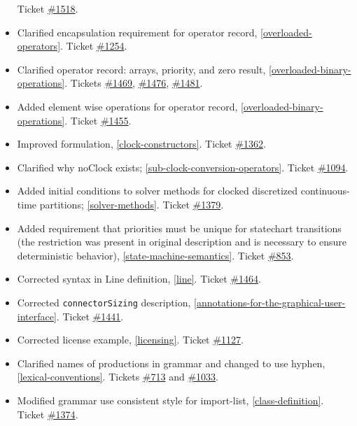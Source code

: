 \begin{itemize}
  Ticket \href{https://github.com/modelica/ModelicaSpecification/issues/1518}{\#1518}.
\item
  Clarified encapsulation requirement for operator record, \cref{overloaded-operators}.
  Ticket \href{https://github.com/modelica/ModelicaSpecification/issues/1254}{\#1254}.
\item
  Clarified operator record: arrays, priority, and zero result,
  \cref{overloaded-binary-operations}. Tickets
  \href{https://github.com/modelica/ModelicaSpecification/issues/1469}{\#1469},
  \href{https://github.com/modelica/ModelicaSpecification/issues/1476}{\#1476},
  \href{https://github.com/modelica/ModelicaSpecification/issues/1481}{\#1481}.
\item
  Added element wise operations for operator record, \cref{overloaded-binary-operations}.
  Ticket \href{https://github.com/modelica/ModelicaSpecification/issues/1455}{\#1455}.
\item
  Improved formulation, \cref{clock-constructors}. Ticket
  \href{https://github.com/modelica/ModelicaSpecification/issues/1362}{\#1362}.
\item
  Clarified why noClock exists; \cref{sub-clock-conversion-operators}. Ticket
  \href{https://github.com/modelica/ModelicaSpecification/issues/1094}{\#1094}.
\item
  Added initial conditions to solver methods for clocked discretized
  continuous-time partitions; \cref{solver-methods}. Ticket
  \href{https://github.com/modelica/ModelicaSpecification/issues/1379}{\#1379}.
\item
  Added requirement that priorities must be unique for statechart
  transitions (the restriction was present in original description and
  is necessary to ensure deterministic behavior), \cref{state-machine-semantics}. Ticket
  \href{https://github.com/modelica/ModelicaSpecification/issues/853}{\#853}.
\item
  Corrected syntax in Line definition, \cref{line}. Ticket
  \href{https://github.com/modelica/ModelicaSpecification/issues/1464}{\#1464}.
\item
  Corrected \lstinline!connectorSizing! description, \cref{annotations-for-the-graphical-user-interface}. Ticket
  \href{https://github.com/modelica/ModelicaSpecification/issues/1441}{\#1441}.
\item
  Corrected license example, \cref{licensing}. Ticket
  \href{https://github.com/modelica/ModelicaSpecification/issues/1127}{\#1127}.
\item
  Clarified names of productions in grammar and changed to use hyphen,
  \cref{lexical-conventions}. Tickets
  \href{https://github.com/modelica/ModelicaSpecification/issues/713}{\#713} and
  \href{https://github.com/modelica/ModelicaSpecification/issues/1033}{\#1033}.
\item
  Modified grammar use consistent style for import-list, \cref{class-definition}.
  Ticket \href{https://github.com/modelica/ModelicaSpecification/issues/1374}{\#1374}.
\end{itemize}

